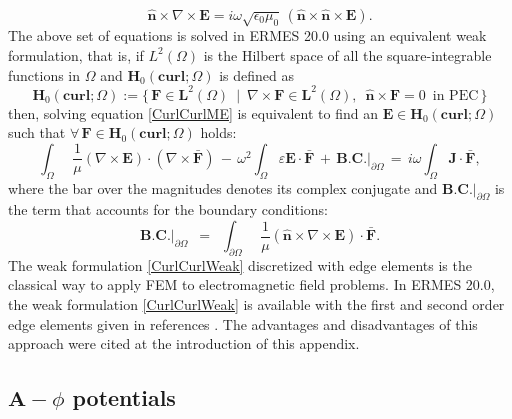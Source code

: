 \begin{equation}\label{BC-1stABC}
	\mathbf{\hat{n}}\times\nabla\times\mathbf{E} = i\omega\sqrt{\epsilon_{0}\mu_{0}}\, (\mathbf{\hat{n}}\times\mathbf{\hat{n}}\times\mathbf{E}).
\end{equation}
The above set of equations is solved in ERMES 20.0 using an equivalent weak formulation, that is, if $L^{2}(\Omega)$ is the Hilbert space of all the square-integrable functions in $\Omega$ and $\mathbf{H}_{0}(\mathbf{curl};\Omega)$ is defined as
\begin{equation}\label{HCurl}
	\mathbf{H}_{0}(\mathbf{curl};\Omega) := \{\,\mathbf{F}\in \mathbf{L}^{2}(\Omega)\enspace|\enspace\nabla\times \mathbf{F} \in \mathbf{L}^{2}(\Omega),\enspace \mathbf{\hat{n}}\times\mathbf{F} = 0\enspace\text{in PEC}\,\}
\end{equation}
then, solving equation \eqref{CurlCurlME} is equivalent to find an $\mathbf{E} \in \mathbf{H}_{0}(\mathbf{curl};\Omega)$ such
that $\forall\,\mathbf{F} \in \mathbf{H}_{0}(\mathbf{curl};\Omega)$ holds:
\begin{equation}\label{CurlCurlWeak}
	\int_{\Omega}\enspace\frac{1}{\mu}(\nabla\times\mathbf{E})\cdot(\nabla\times\mathbf{\bar{F}})\, - \,\omega^{2}\int_{\Omega}\varepsilon\mathbf{E}\cdot\mathbf{\bar{F}}\, + \,\textbf{B.C.}|_{\partial\Omega}\, = \,i\omega\int_{\Omega}\mathbf{J}\cdot\mathbf{\bar{F}},
\end{equation}
where the bar over the magnitudes denotes its complex conjugate and $\textbf{B.C.}|_{\partial\Omega}$ is the term that accounts for the boundary conditions:
\begin{equation}\label{BCGeneral-WF}
	\textbf{B.C.}|_{\partial\Omega}\enspace = \enspace\int_{\partial\Omega}\enspace\frac{1}{\mu}\left(\mathbf{\hat{n}}\times\nabla\times\mathbf{E}\right)\cdot\mathbf{\bar{F}}.
\end{equation}
The weak formulation \eqref{CurlCurlWeak} discretized with edge elements is the classical way to apply FEM to electromagnetic field problems. In ERMES 20.0, the weak formulation \ref{CurlCurlWeak} is available with the first and second order edge elements given in references \cite{Jin, LuisGarcia}. The advantages and disadvantages of this approach were cited at the introduction of this appendix. 

\subsection{$\textbf{A}-\phi$ potentials}\label{sEdgePotentials}

